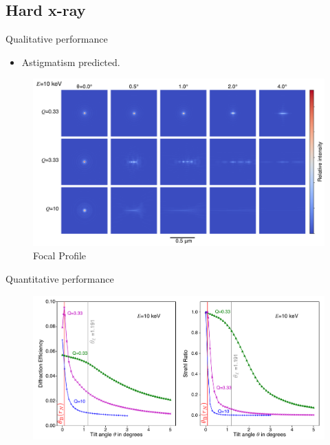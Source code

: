\documentclass{beamer}
\begin{document}
\subsection{Hard x-ray}
\begin{frame}{Qualitative performance}
	\begin{itemize}
		\item Astigmatism predicted.
	\end{itemize}
		\begin{center}
			\begin{figure}
				\includegraphics[scale=0.29]{foc_spot_ten}
				\caption{Focal Profile}	
			\end{figure}
		\end{center}

\end{frame}


\begin{frame}{Quantitative performance}
		\begin{center}
			\begin{figure}
				\includegraphics[scale=0.4]{tilt_plot_ten}
			\end{figure}
		\end{center}
\end{frame}
\end{document}
